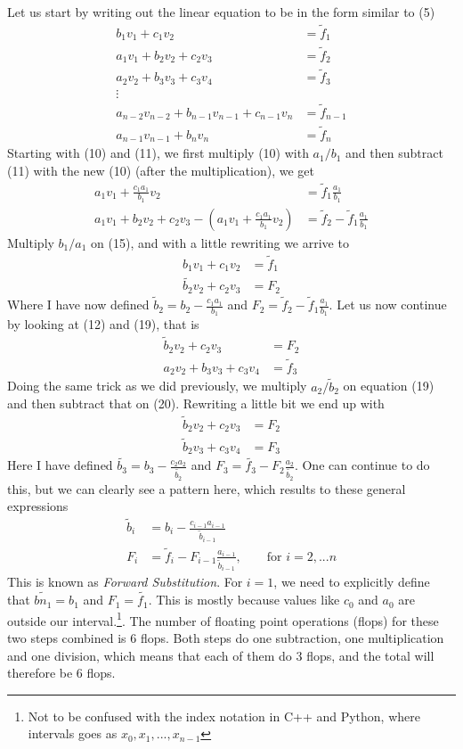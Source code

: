 \documentclass[12pt]{article}
\begin{document}
Let us start by writing out the linear equation to be in the form similar to (5)
\begin{align}
b_1v_1 + c_1v_2 &= \tilde{f}_1 \\
a_1v_1 + b_2v_2 + c_2v_3 &= \tilde{f}_2 \\
a_2v_2 + b_3v_3 + c_3v_4 &= \tilde{f}_3 \\
\vdots \nonumber \\
a_{n-2}v_{n-2} + b_{n-1}v_{n-1} + c_{n-1} v_n &= \tilde{f}_{n-1}\\
a_{n-1}v_{n-1} + b_n v_n &= \tilde{f}_n
\end{align}
Starting with (10) and (11), we first multiply (10) with $a_1/b_1$ and then subtract (11) with the new (10) (after the multiplication), we get
\begin{align}
a_1v_1 + \frac{c_1 a_1}{b_1}v_2 &= \tilde{f}_1\frac{a_1}{b_1}  \\
a_1v_1 + b_2v_2 + c_2v_3 - (a_1v_1 + \frac{c_1 a_1}{b_1} v_2) &= \tilde{f}_2 - \tilde{f}_1\frac{a_1}{b_1}
\end{align}
Multiply $b_1/a_1$ on (15), and with a little rewriting we arrive to
\begin{align}
b_1v_1 + c_1v_2 &= \tilde{f}_1 \\
\tilde{b_2}v_2 + c_2v_3 &= F_2
\end{align}
Where I have now defined $\tilde{b}_2 = b_2 - \frac{c_1 a_1}{b_1}$ and $F_2 = \tilde{f}_2 - \tilde{f}_1\frac{a_1}{b_1}$. Let us now continue by looking at (12) and (19), that is
\begin{align}
\tilde{b}_2 v_2 + c_2 v_3 &= F_2 \\
a_2 v_2 + b_3 v_3 + c_3 v_4 &= \tilde{f}_3
\end{align}
Doing the same trick as we did previously, we multiply $a_2/\tilde{b}_2$ on equation (19) and then subtract that on (20). Rewriting a little bit we end up with
\begin{align}
\tilde{b}_2 v_2 + c_2 v_3 &= F_2 \\
\tilde{b}_2 v_3 + c_3v_4 &= F_3
\end{align}
Here I have defined $\tilde{b_3} = b_3 - \frac{c_2 a_2}{\tilde{b_2}}$ and $F_3 = \tilde{f_3} - F_2\frac{a_2}{\tilde{b_2}}$. One can continue to do this, but we can clearly see a pattern here, which results to these general expressions
\begin{align}
\tilde{b}_i &= b_i - \frac{c_{i-1} a_{i-1}}{\tilde{b}_{i-1}}\\
F_i &= \tilde{f}_i - F_{i-1}\frac{a_{i-1}}{\tilde{b}_{i-1}}, \qquad \text{for } i=2,...n
\end{align}
This is known as \textit{Forward Substitution}. For $i=1$, we need to explicitly define that $\tilde{bn_1} = b_1$ and $F_1 = \tilde{f_1}$. This is mostly because values like $c_0$ and $a_0$ are outside our interval.\footnote{Not to be confused with the index notation in C++ and Python, where intervals goes as $x_0, x_1, ... , x_{n-1}$}. The number of floating point operations (flops) for these two steps combined is	 $6$ flops. Both steps do one subtraction, one multiplication and one division, which means that each of them do $3$ flops, and the total will therefore be $6$ flops.
\end{document}
